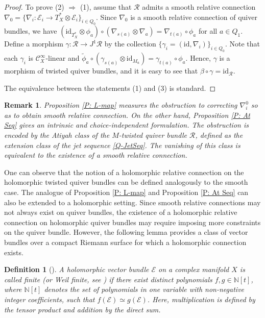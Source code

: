 \documentclass[12pt, reqno]{amsart}
\theoremstyle{plain}
\newtheorem{definition}[theorem]{Definition}
\newtheorem{remark}[theorem]{Remark}
\numberwithin{equation}{section}
\newcommand{\E}{\mathcal{E}}
\begin{document}
\begin{proof}
		To prove (2) $\Longrightarrow$ (1), assume that $\mathcal{R}$ admits a smooth relative connection $\nabla_0=\{\nabla_i:\mathcal{E}_i \rightarrow T_X^* \otimes \mathcal{E}_i\}_{i\in Q_0}$. Since $\nabla_0$ is a smooth relative connection of quiver bundles, we have $(\mathrm{id}_{T_X^*}\otimes \phi_a) \circ (\nabla_{s(a)} \otimes \nabla_a)=\nabla_{t(a)} \circ \phi_a$ for all $a\in Q_1$. Define a morphism $\gamma:\mathcal{R}\rightarrow J^1\mathcal{R}$ by the collection $\{\gamma_i=(\mathrm{id},\nabla_i)\}_{i\in Q_0}$. Note that each $\gamma_i$ is $\mathcal{C}_X^{\infty}$-linear and $\tilde{\phi}_a \circ (\gamma_{s(a)} \otimes \mathrm{id}_{M_a}) = \gamma_{t(a)} \circ \phi_a$. Hence, $\gamma$ is a morphism of twisted quiver bundles, and it is easy to see that $\beta \circ \gamma = \mathrm{id}_{\mathcal{R}}$.
		
		The equivalence between the statements (1) and (3) is standard. 
	\end{proof}

    \begin{remark}
    \rm Proposition \ref{P: L-map} measures the obstruction to correcting $\nabla_i^0$ so as to obtain smooth relative connection. On the other hand, Proposition \ref{P: At Seq} gives an intrinsic and choice-independent formulation. The obstruction is encoded by the Atiyah class of the $M$-twisted quiver bundle $\mathcal R$, defined as the extension class of the jet sequence \eqref{Q-JetSeq}. The vanishing of this class is equivalent to the existence of a smooth relative connection.
    \end{remark}
	
	One can observe that the notion of a holomorphic relative connection on the holomorphic twisted quiver bundles can be defined analogously to the smooth case. The analogue of Proposition \ref{P: L-map} and Proposition \ref{P: At Seq} can also be extended to a holomorphic setting. Since smooth relative connections may not always exist on quiver bundles, the existence of a holomorphic relative connection on holomorphic quiver bundles may require imposing more constraints on the quiver bundle.  However, the following lemma provides a class of vector bundles over a compact Riemann surface for which a holomorphic connection exists.
	
	
	\begin{definition}[{\cite[Definition 2.4]{EH}}]
		\rm
		A holomorphic vector bundle $\E$ on a complex manifold $X$ is called \emph{finite} (or \emph{Weil finite}, see \cite{W}) if there exist
		distinct polynomials $f,g \in \mathbb{N}[t]$, where $\mathbb{N}[t]$ denotes the set of
		polynomials in one variable with non-negative integer coefficients, such that $f(\E) \simeq g(\E)$.
		Here, multiplication is defined by the tensor product and addition by the direct sum.
	\end{definition}
	
\end{document}
